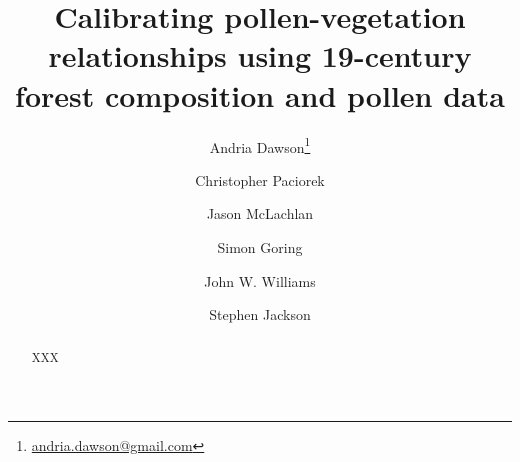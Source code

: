 \documentclass[12pt]{article}
\begin{document}
\nocite{*}

\title{Calibrating pollen-vegetation relationships using 19-century forest composition and pollen data}



\author[1]{Andria Dawson\footnote{\url{andria.dawson@gmail.com}}}
\author[1]{Christopher Paciorek}
\author[2]{Jason McLachlan}
\author[3]{Simon Goring}
\author[3]{John W. Williams}
\author[4]{Stephen Jackson}

\maketitle

\newpage
\begin{abstract}
XXX
\end{abstract}

\end{document}
